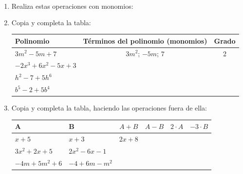 \documentclass[10pt,twoside]{article}
\begin{document}
\begin{enumerate}
\begin{enumerate}
\end{enumerate}
\item Realiza estas operaciones con monomios:
\begin{enumerate}
\end{enumerate}
\item Copia y completa la tabla:
\begin{center}
\begin{tabular}{|l|c|c|}
\hline 
\hspace*{.5cm} Polinomio & Términos del polinomio (monomios) & Grado \\ 
\hline 
$3m^{2}-5m+7$ & $3m^{2}$; \quad $-5m$; \quad $7$ & 2 \\ 
\hline 
$-2x^{3}+6x^{2}-5x+3$ &  &  \\ 
\hline 
$h^{2}-7+5h^{6}$ &  &  \\ 
\hline 
$b^{5}-2+5b^{4}$ &  &  \\ 
\hline 
\end{tabular} 
\end{center}
\item Copia y completa la tabla, haciendo las operaciones fuera de ella:
\begin{center}
\begin{tabular}{|l|l|c|c|c|c|}
\hline 
\hspace*{.5cm} A & \hspace*{.5cm} B & $A+B$ & $A-B$ & $2\cdot A$ & $-3\cdot B$ \\ 
\hline 
$x+5$ & $x+3$ & $2x+8$ &  &  &  \\ 
\hline 
$3x^{2}+2x+5$ & $2x^{2}-6x-1$ &  &  &  &  \\ 
\hline 
$-4m+5m^{2}+6$ & $-4+6m-m^{2}$ &  &  &  &  \\ 

\end{tabular}
\end{center}
\end{enumerate}
\end{document}
